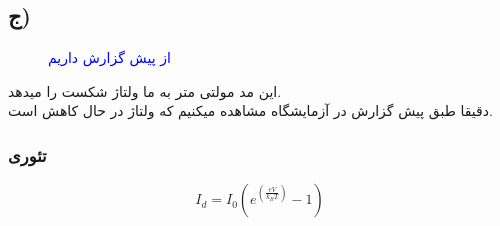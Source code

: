 \subsection{ج)}
\begin{figure}[h]
    \centering
    \caption{\textcolor{blue}{از پیش گزارش داریم}}
\end{figure}
این مد مولتی متر به ما ولتاژ شکست را میدهد. \\
دقیقا طبق پیش گزارش در آزمایشگاه مشاهده میکنیم که ولتاژ در حال کاهش است.
\subsubsection{تئوری}
$$I_d = I_0(e^{(\frac{eV}{k_BT})}-1)$$
\pagebreak
